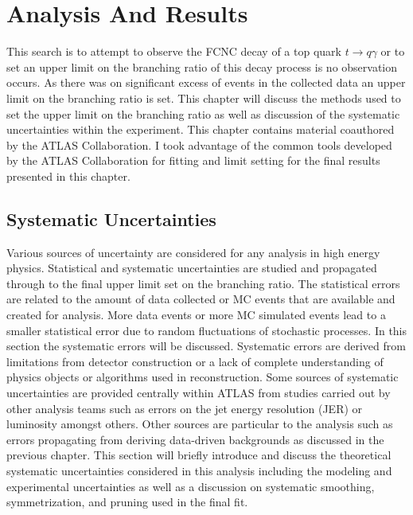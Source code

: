 
\chapter{Analysis And Results}
\label{ch:Results}
This search is to attempt to observe the FCNC decay of a top quark $t \rightarrow q \gamma$ or to set an upper limit on the branching ratio of this decay process is no observation occurs.  As there was on significant excess of events in the collected data an upper limit on the branching ratio is set.  This chapter will discuss  the methods used to set the upper limit on the branching ratio as well as discussion of the systematic uncertainties within the experiment.   This chapter contains material coauthored by the ATLAS Collaboration.  I took advantage of the common tools developed by the ATLAS Collaboration for fitting and limit setting for the final results presented in this chapter.

\section{Systematic Uncertainties}
\label{sec:NPUncertainties}
Various sources of uncertainty are considered for any analysis in high energy physics.  Statistical and systematic uncertainties are studied and propagated through to the final upper limit set on the branching ratio.  The statistical errors are related to the amount of data collected or MC events that are available and created for analysis.  More data events or more MC simulated events lead to a smaller statistical error due to random fluctuations of stochastic processes.  In this section the systematic errors will be discussed.  Systematic errors are derived from limitations from detector construction or a lack of complete understanding of physics objects or algorithms used in reconstruction.  Some sources of systematic uncertainties are provided centrally within ATLAS from studies carried out by other analysis teams such as errors on the jet energy resolution (JER) or luminosity amongst others. Other sources are particular to the analysis such as errors propagating from deriving data-driven backgrounds as discussed in the previous chapter.
This section will briefly introduce and discuss the theoretical systematic uncertainties considered in this analysis including the modeling and experimental uncertainties as well as a discussion on systematic smoothing, symmetrization, and pruning used in the final fit. 

